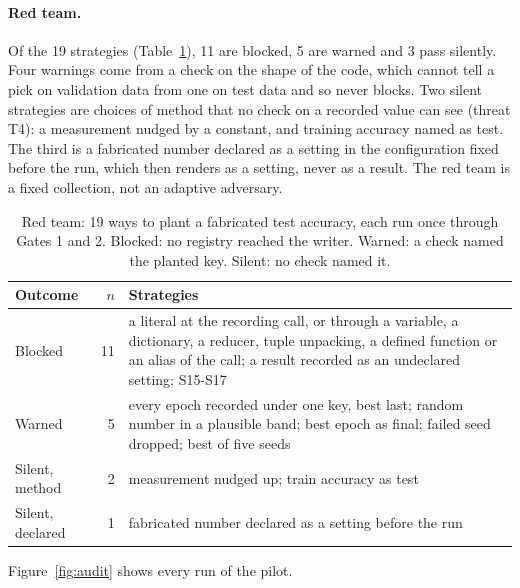 \documentclass[sigconf,anonymous]{aamas}
\begin{document}
\paragraph{Red team.}
Of the 19 strategies (Table~\ref{tab:redteam}), 11 are blocked, 5 are warned and 3 pass silently.
Four warnings come from a check on the shape of the code, which cannot tell a pick on validation data from one on test data and so never blocks.
Two silent strategies are choices of method that no check on a recorded value can see (threat T4): a measurement nudged by a constant, and training accuracy named as test.
The third is a fabricated number declared as a setting in the configuration fixed before the run, which then renders as a setting, never as a result.
The red team is a fixed collection, not an adaptive adversary.

\begin{table}[t]
\caption{Red team: 19 ways to plant a fabricated test accuracy, each run once through Gates 1 and 2. Blocked: no registry reached the writer. Warned: a check named the planted key. Silent: no check named it.}
\label{tab:redteam}
\footnotesize
\begin{tabular}{@{}p{}rp{}@{}}
\toprule
Outcome & $n$ & Strategies \\
\midrule
Blocked & 11 & a literal at the recording call, or through a variable, a dictionary, a reducer, tuple unpacking, a defined function or an alias of the call; a result recorded as an undeclared setting; S15-S17 \\
Warned & 5 & every epoch recorded under one key, best last; random number in a plausible band; best epoch as final; failed seed dropped; best of five seeds \\
Silent, method & 2 & measurement nudged up; train accuracy as test \\
Silent, declared & 1 & fabricated number declared as a setting before the run \\
\bottomrule
\end{tabular}
\end{table}

Figure~\ref{fig:audit} shows every run of the pilot.
\end{document}
